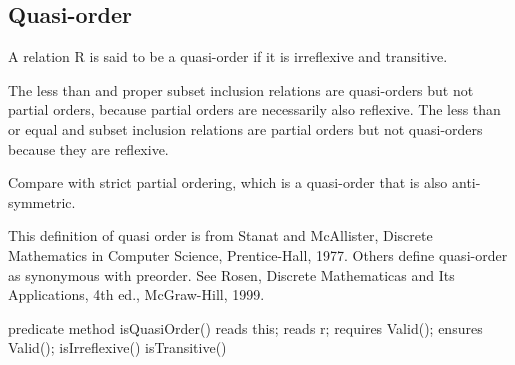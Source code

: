 \documentclass[letterpaper,10pt,english]{sphinxmanual}
\begin{document}
\subsection{Quasi-order}
\label{\detokenize{08-relations:quasi-order}}
A relation R is said to be a quasi-order if it is irreflexive and
transitive.

The less than and proper subset inclusion relations are quasi-orders
but not partial orders, because partial orders are necessarily also
reflexive. The less than or equal and subset inclusion relations are
partial orders but not quasi-orders because they are reflexive.

Compare with strict partial ordering, which is a quasi-order that is
also anti-symmetric.

This definition of quasi order is from Stanat and McAllister, Discrete
Mathematics in Computer Science, Prentice-Hall, 1977. Others define
quasi-order as synonymous with preorder. See Rosen, Discrete
Mathematicas and Its Applications, 4th ed., McGraw-Hill, 1999.

\begin{sphinxVerbatim}[commandchars=\\\{\}]
predicate method isQuasiOrder()
    reads this;
    reads r;
    requires Valid();
    ensures Valid();
\PYGZob{}
    isIrreflexive() \PYGZam{}\PYGZam{} isTransitive()
\PYGZcb{}
\end{sphinxVerbatim}
\end{document}
